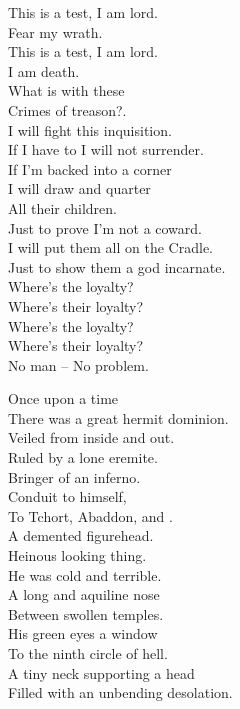 This is a test, I am lord. \\
Fear my wrath. \\
This is a test, I am lord. \\
I am death. \\

What is with these \\
Crimes of treason?. \\
I will fight this inquisition. \\
If I have to I will not surrender. \\
If I'm backed into a corner \\
I will draw and quarter \\
All their children. \\
Just to prove I'm not a coward. \\
I will put them all on the  Cradle. \\
Just to show them a god incarnate. \\

Where's the loyalty? \\
Where's their loyalty? \\
Where's the loyalty? \\
Where's their loyalty? \\
No man -- No problem. \\




Once upon a time \\
There was a great hermit dominion. \\
Veiled from inside and out. \\
Ruled by a lone eremite. \\
Bringer of an inferno. \\
Conduit to  himself, \\
To Tchort, Abaddon, and . \\
A demented figurehead. \\

Heinous looking thing. \\
He was cold and terrible. \\
A long and aquiline nose \\
Between swollen temples. \\
His green eyes a window \\
To the ninth circle of hell. \\
A tiny neck supporting a head \\
Filled with an unbending desolation. \\

